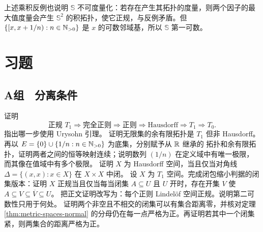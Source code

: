 上述乘积反例也说明 \(\mathbb S\) 不可度量化：若存在产生其拓扑的度量，则两个因子的最大值度量会产生 \(\mathbb S^2\) 的积拓扑，使它正规，与反例矛盾。但 \(\{[x,x+1/n):n\in\mathbb{N}_{>0}\}\) 是 \(x\) 的可数邻域基，所以 \(\mathbb S\) 第一可数。

\section*{习题}

\subsection*{A组　分离条件}
\begin{enumerate}[label=\textbf{\thechapter.\arabic*.}]
 证明
 \[
 \text{正规 }T_1\Longrightarrow\text{完全正则}
 \Longrightarrow\text{正则}\Longrightarrow\text{Hausdorff}
 \Longrightarrow T_1\Longrightarrow T_0.
 \]
 指出哪一步使用 Urysohn 引理。
 证明无限集的余有限拓扑是 \(T_1\) 但非 Hausdorff。再以
 \(E=\{0\}\cup\{1/n:n\in\mathbb{N}_{>0}\}\) 为底集，分别赋予从 \(\mathbb{R}\) 继承的
 拓扑和余有限拓扑，证明两者之间的恒等映射连续；说明数列 \((1/n)\)
 在定义域中有唯一极限，而其像在值域中有多个极限。
 证明 \(X\) 为 Hausdorff 空间，当且仅当对角线
 \(\Delta=\{(x,x):x\in X\}\) 在 \(X\times X\) 中闭。
 设 \(X\) 为 \(T_1\) 空间。完成闭包缩小判据的闭集版本：证明 \(X\) 正规当且仅当每当闭集 \(A\subseteq U\) 且 \(U\) 开时，存在开集 \(V\) 使
 \(A\subseteq V\subseteq\overline V\subseteq U\)。
 把正文证明改写为：每个正则 Lindelöf 空间正规。说明第二可数性只用于何处。
 证明两个非空且不相交的闭集可以有集合距离零，并核对定理
 \ref{thm:metric-spaces-normal} 的分母仍在每一点严格为正。再证明若其中一个闭集紧，则两集合的距离严格为正。
\end{enumerate}


